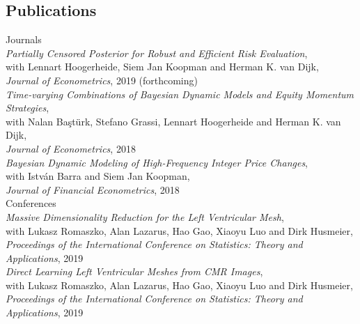 \documentclass[margin,line]{resume}
\begin{document}
\begin{resume}
\section{\mysidestyle Publications}
{\mysidestyle Journals} \vspace{1mm}\\
\textit{Partially Censored Posterior for Robust and Efficient Risk Evaluation},\\
	with Lennart Hoogerheide, Siem Jan Koopman and Herman K. van Dijk,\\
	\textit{Journal of Econometrics}, 2019 (forthcoming) \vspace{1mm}\\ 
\textit{Time-varying Combinations of Bayesian Dynamic Models and Equity Momentum Strategies},\\
	with Nalan Ba\c{s}t\"{u}rk, Stefano Grassi, Lennart Hoogerheide and Herman K. van Dijk,\\
	\textit{Journal of Econometrics}, 2018 \vspace{1mm} \\
\textit{Bayesian Dynamic Modeling of High-Frequency Integer Price Changes},\\
	with Istv\'{a}n Barra  and Siem Jan Koopman,\\
	\textit{Journal of Financial Econometrics}, 2018   \vspace{1mm} \\ 
{\mysidestyle Conferences}  \vspace{1mm}\\	
\textit{Massive Dimensionality Reduction for the Left Ventricular Mesh},\\
	with Lukasz Romaszko, Alan Lazarus, Hao Gao, Xiaoyu Luo and Dirk Husmeier,\\
	\textit{Proceedings of the International Conference on Statistics: Theory and Applications}, 2019  \vspace{1mm}\\
\textit{Direct Learning Left Ventricular Meshes from CMR Images},\\
	with Lukasz Romaszko, Alan Lazarus, Hao Gao, Xiaoyu Luo and Dirk Husmeier,\\
	\textit{Proceedings of the International Conference on Statistics: Theory and Applications}, 2019 \vspace{1mm} \\

\pagebreak

\end{resume}
\end{document}
